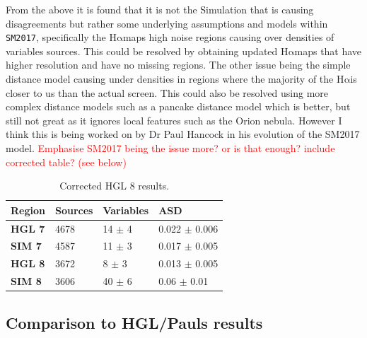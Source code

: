 \documentclass[a4paper, 10pt]{article}
\def\halpha{$\mathrm{H\alpha}$\;}
\def\sm{\texttt{SM2017}}
\begin{document}
From the above it is found that it is not the Simulation that is causing disagreements but rather some underlying assumptions and models within \sm, specifically the \halpha maps high noise regions causing over densities of variables sources. This could be resolved by obtaining updated \halpha maps that have higher resolution and have no missing regions. The other issue being the simple distance model causing under densities in regions where the majority of the \halpha is closer to us than the actual screen. This could also be resolved using more complex distance models such as a pancake distance model which is better, but still not great as it ignores local features such as the Orion nebula. However I think this is being worked on by Dr Paul Hancock in his evolution of the SM2017 model.
\textcolor{red}{Emphasise SM2017 being the issue more? or is that enough? include corrected table? (see below)}
\begin{table}[H]
    \centering
\begin{tabular}{llll}
    \toprule
    \textbf{Region}	& \textbf{Sources}	&	\textbf{Variables}	&		\textbf{ASD}		\\ \midrule

    \textbf{HGL 7}	&	4678 &	14 $\pm$ 4	&	0.022 $\pm$ 0.006	\\
    \textbf{SIM 7}	&	4587 &	11 $\pm$ 3	&	0.017 $\pm$ 0.005	\\\midrule
    \textbf{HGL 8}	&	3672 &	8 $\pm$ 3 	&	0.013 $\pm$ 0.005	\\
    \textbf{SIM 8}	&   3606 &	40 $\pm$ 6	&	0.06 $\pm$ 0.01	\\\bottomrule
\end{tabular}
    \caption{Corrected HGL 8 results.}
    \label{tab:HGLcorr}
\end{table}
\subsection{Comparison to HGL/Pauls results}
\end{document}
